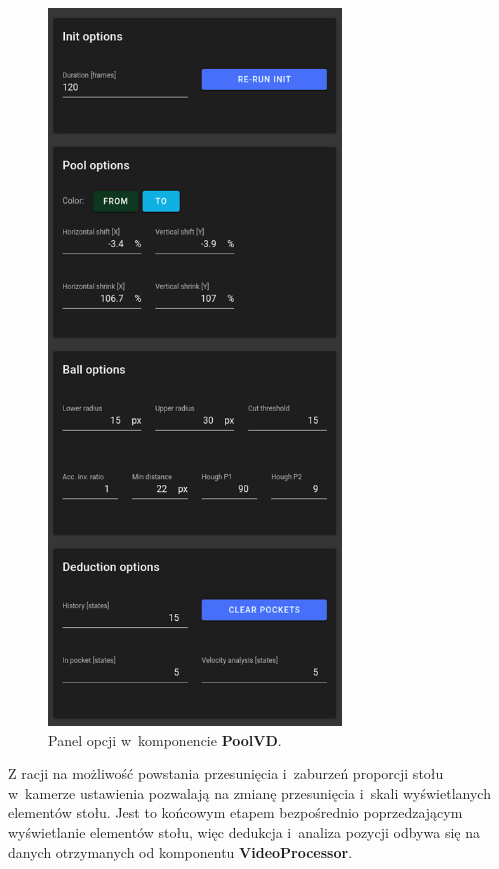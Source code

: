 \documentclass[12pt]{article}
\begin{document}
\begin{figure}[!htb]
    \centering
    \includegraphics[height=19cm]{./images/options.png}
    \caption{Panel opcji w~komponencie \textbf{PoolVD}.}
    \label{options}
\end{figure}

Z racji na możliwość powstania przesunięcia i~zaburzeń proporcji stołu w~kamerze ustawienia pozwalają na zmianę przesunięcia i~skali wyświetlanych elementów stołu. Jest to końcowym etapem bezpośrednio poprzedzającym wyświetlanie elementów stołu, więc dedukcja i~analiza pozycji odbywa się na danych otrzymanych od komponentu \textbf{VideoProcessor}.
\end{document}
